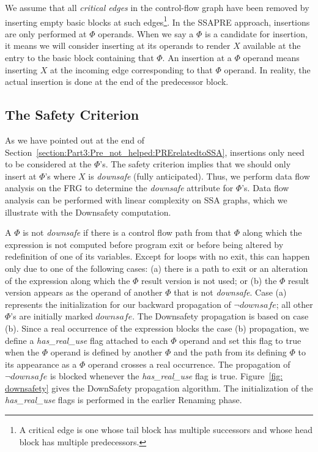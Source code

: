 We assume that all \emph{critical edges}
in the control-flow graph have been removed by inserting empty basic blocks
at such edges\footnote{A critical edge is one whose tail block has multiple
successors and whose head block has multiple predecessors.}.
In the SSAPRE approach, insertions are only performed at $\Phi$ operands.
When we say a $\Phi$ is a candidate for insertion, it means we will consider
inserting at its operands to render $X$ available at the entry to the basic
block containing that $\Phi$.  An insertion at a $\Phi$ operand means inserting
$X$ at the incoming edge corresponding to that $\Phi$ operand.  In reality,
the actual insertion is done at the end of the predecessor block.

\subsection{The Safety Criterion}

As we have pointed out at the end of 
Section~\ref{section:Part3:Pre_not_helped:PRErelatedtoSSA},
insertions only need to be considered at the $\Phi$'s.
The safety criterion implies that we should only insert at $\Phi$'s where $X$ 
is \emph{downsafe} (fully anticipated).  Thus, we perform data flow analysis on
the FRG to determine the \emph{downsafe} attribute for $\Phi$'s.
Data flow analysis can be performed with linear complexity on SSA graphs, which
we illustrate with the Downsafety computation.

A $\Phi$ is not \emph{downsafe} if there is a control flow path from that 
$\Phi$ along which the expression is not computed before program exit or 
before 
being altered by redefinition of one of its variables.  Except for loops with
no exit, this can happen only due to one of the following cases: (a) there
is a path to exit or an alteration of the expression
along which the $\Phi$ result version is not used; or (b) the $\Phi$ result
version appears as the operand of another $\Phi$ that is not \emph{downsafe}.
Case (a) represents the initialization for our backward propagation of 
$\neg downsafe$; all other $\Phi$'s are initially marked $downsafe$.
The Downsafety propagation is based on case (b).  Since a real occurrence of 
the expression blocks the case (b) propagation, we define a 
\emph{has\_real\_use} flag attached to each $\Phi$ operand and set this flag to
true when the $\Phi$ operand is defined by another $\Phi$ and the path from its
defining $\Phi$ to its appearance as a $\Phi$ operand crosses a real occurrence.
The propagation of $\neg downsafe$ is blocked whenever the \emph{has\_real\_use}
flag is true.  Figure~\ref{fig: downsafety} gives the DownSafety propagation
algorithm.  The initialization of the \emph{has\_real\_use}
flags is performed in the earlier Renaming phase.

